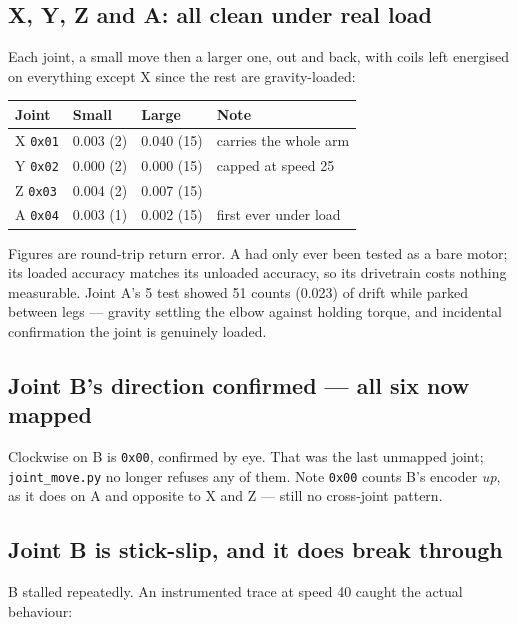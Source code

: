 \documentclass[11pt,letterpaper]{article}
\begin{document}
\subsection{X, Y, Z and A: all clean under real load}
Each joint, a small move then a larger one, out and back, with coils left
energised on everything except X since the rest are gravity-loaded:

\begin{center}
\begin{tabular}{llll}
\toprule
\textbf{Joint} & \textbf{Small} & \textbf{Large} & \textbf{Note} \\ \midrule
X \texttt{0x01} & 0.003\textdegree{} (2\textdegree{}) & 0.040\textdegree{} (15\textdegree{}) & carries the whole arm \\
Y \texttt{0x02} & 0.000\textdegree{} (2\textdegree{}) & 0.000\textdegree{} (15\textdegree{}) & capped at speed 25 \\
Z \texttt{0x03} & 0.004\textdegree{} (2\textdegree{}) & 0.007\textdegree{} (15\textdegree{}) & \\
A \texttt{0x04} & 0.003\textdegree{} (1\textdegree{}) & 0.002\textdegree{} (15\textdegree{}) & first ever under load \\
\bottomrule
\end{tabular}
\end{center}

Figures are round-trip return error. A had only ever been tested as a bare
motor; its loaded accuracy matches its unloaded accuracy, so its drivetrain
costs nothing measurable. Joint A's 5\textdegree{} test showed 51 counts
(0.023\textdegree{}) of drift while parked between legs --- gravity settling the
elbow against holding torque, and incidental confirmation the joint is genuinely
loaded.

\subsection{Joint B's direction confirmed --- all six now mapped}
Clockwise on B is \texttt{0x00}, confirmed by eye. That was the last unmapped
joint; \texttt{joint\_move.py} no longer refuses any of them. Note \texttt{0x00}
counts B's encoder \emph{up}, as it does on A and opposite to X and Z --- still
no cross-joint pattern.

\subsection{Joint B is stick-slip, and it does break through}
B stalled repeatedly. An instrumented trace at speed 40 caught the actual
behaviour:
\end{document}
